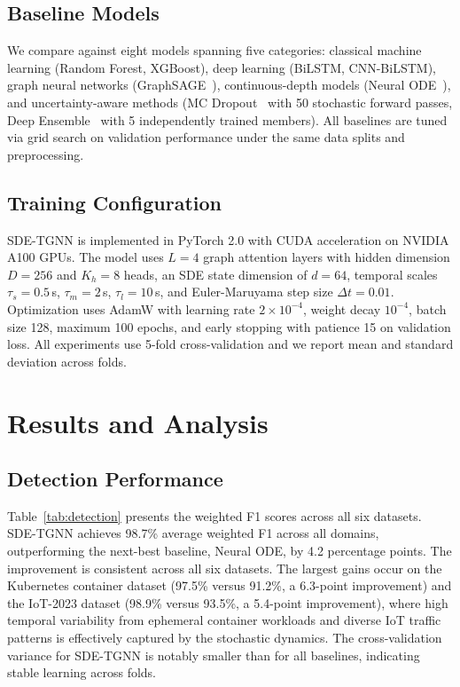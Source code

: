 \documentclass[journal]{IEEEtran}
\begin{document}
\subsection{Baseline Models}

We compare against eight models spanning five categories: classical machine learning (Random Forest, XGBoost), deep learning (BiLSTM, CNN-BiLSTM), graph neural networks (GraphSAGE~\cite{hamilton2017inductive}), continuous-depth models (Neural ODE~\cite{chen2018neural}), and uncertainty-aware methods (MC Dropout~\cite{gal2016dropout} with 50 stochastic forward passes, Deep Ensemble~\cite{lakshminarayanan2017simple} with 5 independently trained members). All baselines are tuned via grid search on validation performance under the same data splits and preprocessing.


\subsection{Training Configuration}

SDE-TGNN is implemented in PyTorch 2.0 with CUDA acceleration on NVIDIA A100 GPUs. The model uses $L = 4$ graph attention layers with hidden dimension $D = 256$ and $K_h = 8$ heads, an SDE state dimension of $d = 64$, temporal scales $\tau_s = 0.5$\,s, $\tau_m = 2$\,s, $\tau_l = 10$\,s, and Euler-Maruyama step size $\Delta t = 0.01$. Optimization uses AdamW with learning rate $2 \times 10^{-4}$, weight decay $10^{-4}$, batch size 128, maximum 100 epochs, and early stopping with patience 15 on validation loss. All experiments use 5-fold cross-validation and we report mean and standard deviation across folds.


\section{Results and Analysis}
\label{sec:results}


\subsection{Detection Performance}

Table~\ref{tab:detection} presents the weighted F1 scores across all six datasets. SDE-TGNN achieves 98.7\% average weighted F1 across all domains, outperforming the next-best baseline, Neural ODE, by 4.2 percentage points. The improvement is consistent across all six datasets. The largest gains occur on the Kubernetes container dataset (97.5\% versus 91.2\%, a 6.3-point improvement) and the IoT-2023 dataset (98.9\% versus 93.5\%, a 5.4-point improvement), where high temporal variability from ephemeral container workloads and diverse IoT traffic patterns is effectively captured by the stochastic dynamics. The cross-validation variance for SDE-TGNN is notably smaller than for all baselines, indicating stable learning across folds.
\end{document}
